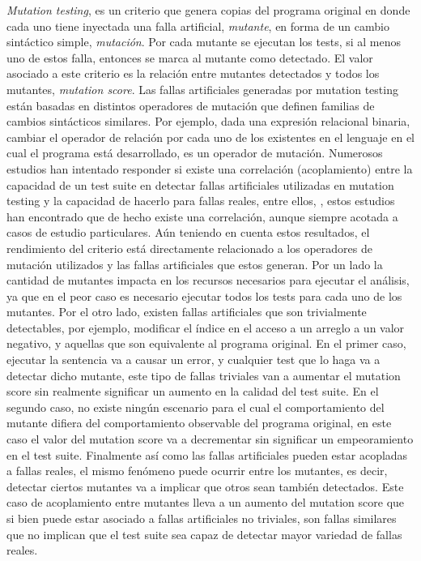 \emph{Mutation testing}, es un criterio que genera copias del programa original en donde cada uno tiene inyectada una falla artificial, \emph{mutante}, en forma de un cambio sint\'actico simple, \emph{mutaci\'on}. Por cada mutante se ejecutan los tests, si al menos uno de estos falla, entonces se marca al mutante como detectado. El valor asociado a este criterio es la relaci\'on entre mutantes detectados y todos los mutantes, \emph{mutation score}. Las fallas artificiales generadas por mutation testing est\'an basadas en distintos operadores de mutaci\'on que definen familias de cambios sint\'acticos similares. Por ejemplo, dada una expresi\'on relacional binaria, cambiar el operador de relaci\'on por cada uno de los existentes en el lenguaje en el cual el programa est\'a desarrollado, es un operador de mutaci\'on. Numerosos estudios han intentado responder si existe una correlaci\'on (acoplamiento) entre la capacidad de un test suite en detectar fallas artificiales utilizadas en mutation testing y la capacidad de hacerlo para fallas reales, entre ellos, \cite{bibliography.mutation.evaluation.coupling.Offutt89, bibliography.mutation.evaluation.coupling.Offutt92, bibliography.mutation.evaluation.HAndrews05, bibliography.mutation.evaluation.valid-substitute}, estos estudios han encontrado que de hecho existe una correlaci\'on, aunque siempre acotada a casos de estudio particulares. A\'un teniendo en cuenta estos resultados, el rendimiento del criterio est\'a directamente relacionado a los operadores de mutaci\'on utilizados y las fallas artificiales que estos generan. Por un lado la cantidad de mutantes impacta en los recursos necesarios para ejecutar el an\'alisis, ya que en el peor caso es necesario ejecutar todos los tests para cada uno de los mutantes. Por el otro lado, existen fallas artificiales que son trivialmente detectables, por ejemplo, modificar el \'indice en el acceso a un arreglo a un valor negativo, y aquellas que son equivalente al programa original. En el primer caso, ejecutar la sentencia va a causar un error, y cualquier test que lo haga va a detectar dicho mutante, este tipo de fallas triviales van a aumentar el mutation score sin realmente significar un aumento en la calidad del test suite. En el segundo caso, no existe ning\'un escenario para el cual el comportamiento del mutante difiera del comportamiento observable del programa original, en este caso el valor del mutation score va a decrementar sin significar un empeoramiento en el test suite. Finalmente as\'i como las fallas artificiales pueden estar acopladas a fallas reales, el mismo fen\'omeno puede ocurrir entre los mutantes, es decir, detectar ciertos mutantes va a implicar que otros sean tambi\'en detectados. Este caso de acoplamiento entre mutantes lleva a un aumento del mutation score que si bien puede estar asociado a fallas artificiales no triviales, son fallas similares que no implican que el test suite sea capaz de detectar mayor variedad de fallas reales.

